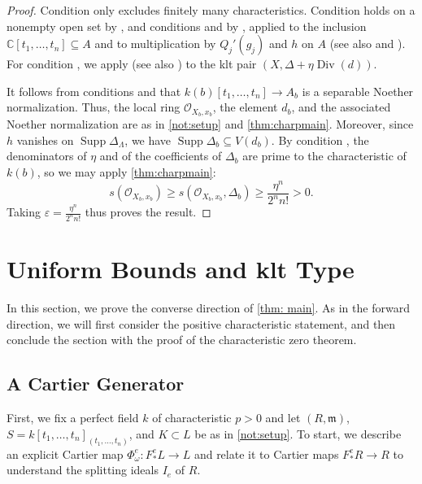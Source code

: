 \documentclass[11pt,leqno]{amsart}
\numberwithin{equation}{section}
\theoremstyle{definition}
\theoremstyle{remark}
\renewcommand{\O}{\mathcal{O}}
\newcommand{\C}{\mathbb{C}}
\newcommand{\vare}{\varepsilon}
\newcommand{\Div}{\operatorname{Div}}
\providecommand{\frm}{}
\renewcommand{\frm}{\mathfrak{m}}
\newcommand{\Supp}{\operatorname{Supp}}
\begin{document}
\begin{proof}
Condition  only excludes finitely many characteristics. Condition  holds on a nonempty open set by \cite[Chapter 6, Proposition 1.16(c), (h), (l) and its proof]{SSbook}, and conditions  and  by \cite[Chapter 6, Lemma 1.12 and Corollary 1.13]{SSbook}, applied to the inclusion $\C[t_1, \dots, t_n] \subseteq A$ and to multiplication by $Q_j'(g_j)$ and $h$ on $A$ (see also \cite[6.9.1]{EGAIV2} and \cite[9.5.6, 9.7.7, 9.9.5]{EGAIV3}). For condition , we apply \cite[Chapter 6, Theorem 4.23]{SSbook} (see also \cite[Corollary 3.4]{takagi04}) to the klt pair $(X, \Delta + \eta \Div(d))$.

It follows from conditions  and  that $k(b)[t_1, \dots, t_n] \to A_b$ is a separable Noether normalization. Thus, the local ring $\O_{X_b, x_b}$, the element $d_b$, and the associated Noether normalization are as in \cref{not:setup} and \cref{thm:charpmain}. Moreover, since $h$ vanishes on $\Supp \Delta_\Lambda$, we have $\Supp \Delta_b \subseteq V(d_b)$. By condition , the denominators of $\eta$ and of the coefficients of $\Delta_b$ are prime to the characteristic of $k(b)$, so we may apply \cref{thm:charpmain}:  $$s(\mathcal{O}_{X_b, x_b}) \geq s(\mathcal{O}_{X_b, x_b}, \Delta_b) \geq  \frac{\eta^n}{2^n n!} > 0. $$ Taking $\vare = \frac{\eta^n}{2^n n!}$ thus proves the result.
\end{proof}

\section{Uniform Bounds and klt Type}

In this section, we prove the converse direction of \cref{thm: main}. As in the forward direction, we will first consider the positive characteristic statement, and then conclude the section with the proof of the characteristic zero theorem. 


\subsection*{A Cartier Generator} First, we fix a perfect field $k$ of characteristic $p> 0$ and let $(R, \frm)$, $S = k[t_1, \dots, t_n]_{(t_1, \dots, t_n)}$, and $K \subset L$ be as in \cref{not:setup}. To start, we describe an explicit Cartier map $\Phi^e_\omega: F^e_*L \to L$ and relate it to Cartier maps $F^e_*R\to R$ to understand the splitting ideals $I_e$ of $R$.  
\end{document}
